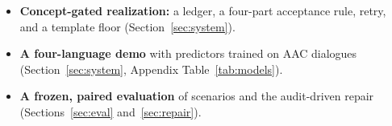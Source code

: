 \begin{itemize}
\item \textbf{Concept-gated realization:} a ledger, a four-part acceptance rule, retry, and a template floor (Section~\ref{sec:system}).
\item \textbf{A four-language demo} with predictors trained on AAC dialogues (Section~\ref{sec:system}, Appendix Table~\ref{tab:models}).
\item \textbf{A frozen, paired evaluation} of \NPrimAll{} scenarios and the audit-driven repair (Sections~\ref{sec:eval} and~\ref{sec:repair}).
\end{itemize}
